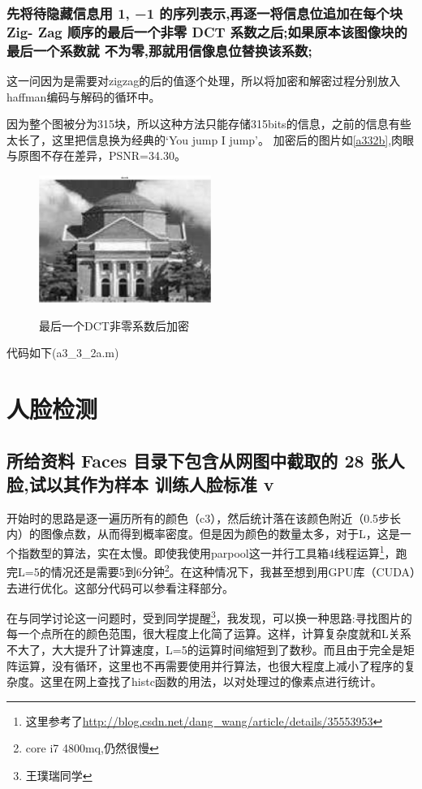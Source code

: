 \documentclass{ctexart}
\begin{document}
\subsubsection{
先将待隐藏信息用 1, −1 的序列表示,再逐一将信息位追加在每个块 Zig-
Zag 顺序的最后一个非零 DCT 系数之后;如果原本该图像块的最后一个系数就
不为零,那就用信像息位替换该系数;
}
这一问因为是需要对zigzag的后的值逐个处理，所以将加密和解密过程分别放入haffman编码与解码的循环中。

因为整个图被分为315块，所以这种方法只能存储315bits的信息，之前的信息有些太长了，这里把信息换为经典的‘You jump I jump’。
加密后的图片如\ref{a332b},肉眼与原图不存在差异，PSNR=34.30。

\begin{figure}
    \centering
    \includegraphics[width=0.5\textwidth]{pic/a3_3_2c.jpg}\\
    \caption{最后一个DCT非零系数后加密\label{a332c}}
\end{figure}
代码如下(a3\_3\_2a.m)

\section{
人脸检测}
\subsection{所给资料 Faces 目录下包含从网图中截取的 28 张人脸,试以其作为样本
训练人脸标准 v}
开始时的思路是逐一遍历所有的颜色（c3），然后统计落在该颜色附近（0.5步长内）的图像点数，从而得到概率密度。但是因为颜色的数量太多，对于L，这是一个指数型的算法，实在太慢。即使我使用parpool这一并行工具箱4线程运算\footnote{这里参考了\url{http://blog.csdn.net/dang\_wang/article/details/35553953}}，跑完L=5的情况还是需要5到6分钟\footnote{core i7
4800mq,仍然很慢}。在这种情况下，我甚至想到用GPU库（CUDA）去进行优化。这部分代码可以参看注释部分。

在与同学讨论这一问题时，受到同学提醒\footnote{王璞瑞同学}，我发现，可以换一种思路:寻找图片的每一个点所在的颜色范围，很大程度上化简了运算。这样，计算复杂度就和L关系不大了，大大提升了计算速度，L=5的运算时间缩短到了数秒。而且由于完全是矩阵运算，没有循环，这里也不再需要使用并行算法，也很大程度上减小了程序的复杂度。这里在网上查找了histc函数的用法，以对处理过的像素点进行统计。
\end{document}
